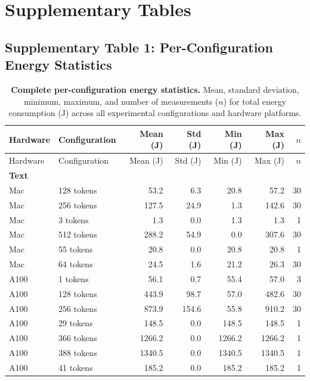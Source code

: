\documentclass[11pt]{article}
\begin{document}
\clearpage

\section{Supplementary Tables}

\subsection{Supplementary Table 1: Per-Configuration Energy Statistics}

\begin{longtable}{llrrrrr}
\caption{\textbf{Complete per-configuration energy statistics.} Mean, standard deviation, minimum, maximum, and number of measurements ($n$) for total energy consumption (J) across all experimental configurations and hardware platforms.} \\
\toprule
Hardware & Configuration & Mean (J) & Std (J) & Min (J) & Max (J) & $n$ \\
\midrule
\endfirsthead
\toprule
Hardware & Configuration & Mean (J) & Std (J) & Min (J) & Max (J) & $n$ \\
\midrule
\endhead
\midrule
\multicolumn{8}{l}{\textbf{Text}} \\
\midrule
Mac & 128 tokens & 53.2 & 6.3 & 20.8 & 57.2 & 30 \\
Mac & 256 tokens & 127.5 & 24.9 & 1.3 & 142.6 & 30 \\
Mac & 3 tokens & 1.3 & 0.0 & 1.3 & 1.3 & 1 \\
Mac & 512 tokens & 288.2 & 54.9 & 0.0 & 307.6 & 30 \\
Mac & 55 tokens & 20.8 & 0.0 & 20.8 & 20.8 & 1 \\
Mac & 64 tokens & 24.5 & 1.6 & 21.2 & 26.3 & 30 \\
A100 & 1 tokens & 56.1 & 0.7 & 55.4 & 57.0 & 3 \\
A100 & 128 tokens & 443.9 & 98.7 & 57.0 & 482.6 & 30 \\
A100 & 256 tokens & 873.9 & 154.6 & 55.8 & 910.2 & 30 \\
A100 & 29 tokens & 148.5 & 0.0 & 148.5 & 148.5 & 1 \\
A100 & 366 tokens & 1266.2 & 0.0 & 1266.2 & 1266.2 & 1 \\
A100 & 388 tokens & 1340.5 & 0.0 & 1340.5 & 1340.5 & 1 \\
A100 & 41 tokens & 185.2 & 0.0 & 185.2 & 185.2 & 1 \\

\end{longtable}
\end{document}
